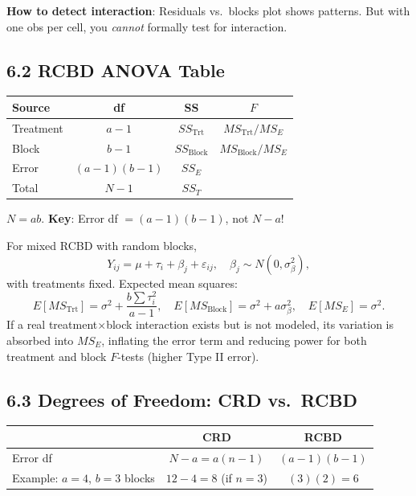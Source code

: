 \documentclass[9pt,letterpaper]{article}
\begin{document}
\textbf{How to detect interaction}: Residuals vs.\ blocks plot shows patterns. But with one obs per cell, you \emph{cannot} formally test for interaction.

\subsection{6.2 RCBD ANOVA Table}

\begin{center}\small
\begin{tabular}{@{}lccc@{}}
\toprule
Source & df & SS & $F$ \\
\midrule
Treatment & $a-1$ & $SS_{\text{Trt}}$ & $MS_{\text{Trt}}/MS_E$ \\
Block & $b-1$ & $SS_{\text{Block}}$ & $MS_{\text{Block}}/MS_E$ \\
Error & $(a-1)(b-1)$ & $SS_E$ & \\
Total & $N-1$ & $SS_T$ & \\
\bottomrule
\end{tabular}
\end{center}

$N=ab$. \textbf{Key}: Error df $= (a-1)(b-1)$, not $N-a$!

For mixed RCBD with random blocks,
\[
Y_{ij} = \mu + \tau_i + \beta_j + \varepsilon_{ij},\quad \beta_j\sim N(0,\sigma_\beta^2),
\]
with treatments fixed. Expected mean squares:
\[
E[MS_{\text{Trt}}] = \sigma^2 + \frac{b\sum\tau_i^2}{a-1},\quad
E[MS_{\text{Block}}] = \sigma^2 + a\sigma_\beta^2,\quad
E[MS_E] = \sigma^2.
\]
If a real treatment$\times$block interaction exists but is not modeled, its variation is absorbed into $MS_E$, inflating the error term and reducing power for both treatment and block $F$-tests (higher Type II error).


\subsection{6.3 Degrees of Freedom: CRD vs.\ RCBD}

\begin{center}\small
\begin{tabular}{@{}lcc@{}}
\toprule
 & \textbf{CRD} & \textbf{RCBD} \\
\midrule
Error df & $N - a = a(n-1)$ & $(a-1)(b-1)$ \\
Example: $a=4$, $b=3$ blocks & $12 - 4 = 8$ (if $n=3$) & $(3)(2) = 6$ \\
\bottomrule
\end{tabular}
\end{center}
\end{document}
